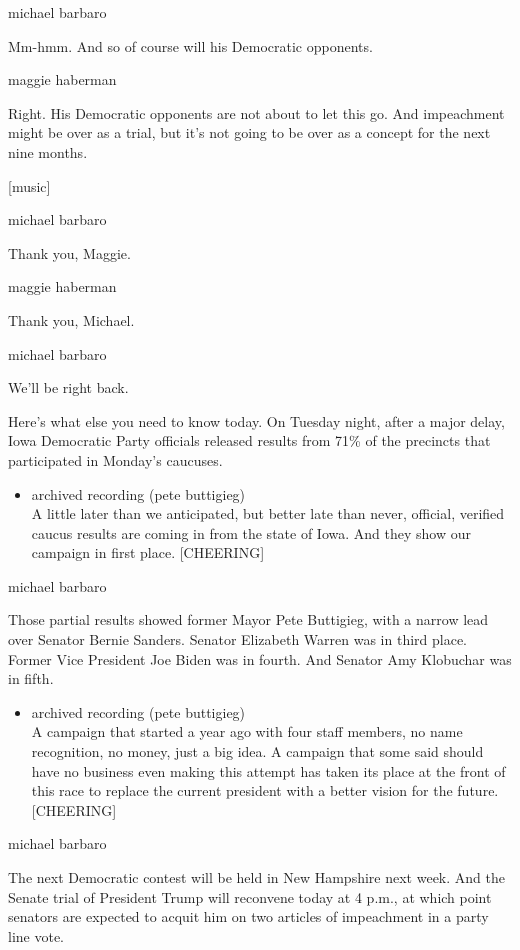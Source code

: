 michael barbaro

Mm-hmm. And so of course will his Democratic opponents.

maggie haberman

Right. His Democratic opponents are not about to let this go. And
impeachment might be over as a trial, but it's not going to be over as a
concept for the next nine months.

{[}music{]}

michael barbaro

Thank you, Maggie.

maggie haberman

Thank you, Michael.

michael barbaro

We'll be right back.

Here's what else you need to know today. On Tuesday night, after a major
delay, Iowa Democratic Party officials released results from 71\% of the
precincts that participated in Monday's caucuses.

\begin{itemize}
\tightlist
\item
  archived recording (pete buttigieg)\\
  A little later than we anticipated, but better late than never,
  official, verified caucus results are coming in from the state of
  Iowa. And they show our campaign in first place. {[}CHEERING{]}
\end{itemize}

michael barbaro

Those partial results showed former Mayor Pete Buttigieg, with a narrow
lead over Senator Bernie Sanders. Senator Elizabeth Warren was in third
place. Former Vice President Joe Biden was in fourth. And Senator Amy
Klobuchar was in fifth.

\begin{itemize}
\tightlist
\item
  archived recording (pete buttigieg)\\
  A campaign that started a year ago with four staff members, no name
  recognition, no money, just a big idea. A campaign that some said
  should have no business even making this attempt has taken its place
  at the front of this race to replace the current president with a
  better vision for the future. {[}CHEERING{]}
\end{itemize}

michael barbaro

The next Democratic contest will be held in New Hampshire next week. And
the Senate trial of President Trump will reconvene today at 4 p.m., at
which point senators are expected to acquit him on two articles of
impeachment in a party line vote.

